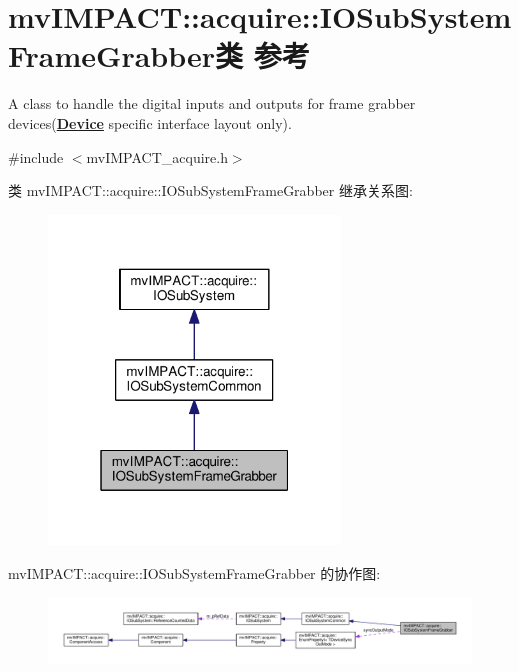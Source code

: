 \hypertarget{classmv_i_m_p_a_c_t_1_1acquire_1_1_i_o_sub_system_frame_grabber}{\section{mv\+I\+M\+P\+A\+C\+T\+:\+:acquire\+:\+:I\+O\+Sub\+System\+Frame\+Grabber类 参考}
\label{classmv_i_m_p_a_c_t_1_1acquire_1_1_i_o_sub_system_frame_grabber}
}


A class to handle the digital inputs and outputs for frame grabber devices({\bfseries \hyperlink{classmv_i_m_p_a_c_t_1_1acquire_1_1_device}{Device}} specific interface layout only).  




{\ttfamily \#include $<$mv\+I\+M\+P\+A\+C\+T\+\_\+acquire.\+h$>$}



类 mv\+I\+M\+P\+A\+C\+T\+:\+:acquire\+:\+:I\+O\+Sub\+System\+Frame\+Grabber 继承关系图\+:
\nopagebreak
\begin{figure}[H]
\begin{center}
\leavevmode
\includegraphics[width=220pt]{classmv_i_m_p_a_c_t_1_1acquire_1_1_i_o_sub_system_frame_grabber__inherit__graph}
\end{center}
\end{figure}


mv\+I\+M\+P\+A\+C\+T\+:\+:acquire\+:\+:I\+O\+Sub\+System\+Frame\+Grabber 的协作图\+:
\nopagebreak
\begin{figure}[H]
\begin{center}
\leavevmode
\includegraphics[width=350pt]{classmv_i_m_p_a_c_t_1_1acquire_1_1_i_o_sub_system_frame_grabber__coll__graph}
\end{center}
\end{figure}
